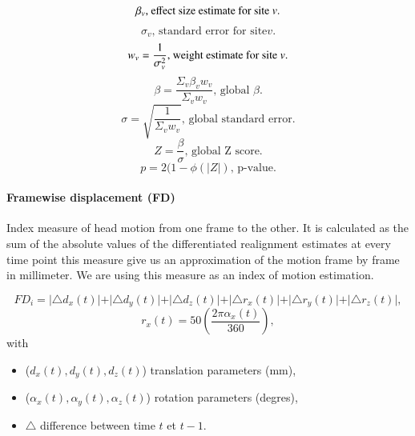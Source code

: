 \documentclass[authoryear]{elsarticle}
\begin{document}
\begin{equation}
	\beta_{v} \text{, effect size estimate for site \textit{v}.}
\end{equation}
\begin{equation}
	\sigma_{v} \text{, standard error for site} \textit{v}.
\end{equation}
\begin{equation}
 	w_{v}=\frac{1}{\sigma_{v}^{2}} \text{, weight estimate for site \textit{v}.}
 \end{equation}
 \begin{equation}
 	\beta=\frac{\Sigma_{v}\beta_{v}w_{v}}{\Sigma_{v}w_{v}} \text{, global }\beta.
 \end{equation}
  \begin{equation}
 	\sigma=\sqrt{\frac{1}{\Sigma_{v}w_{v}}} \text{, global standard error.}
 \end{equation}
\begin{equation}\label{METAL}
	Z=\frac{\beta}{\sigma} \text{, global Z score.}
\end{equation}
\begin{equation}
	p=2(1-\phi(\vert Z \vert) \text{, p-value.}
\end{equation}



\paragraph{Framewise displacement (FD)}
Index measure of head motion from one frame to the other. It is calculated as the sum of the absolute values of the differentiated realignment estimates at every time point \citep{Power2012} this measure give us an approximation of the motion frame by frame in millimeter. We are using this measure as an index of motion estimation.

\begin{equation}
    FD_{i} = \vert \triangle d_{x}(t) \vert + \vert \triangle d_{y}(t) \vert + \vert \triangle d_{z}(t) \vert + \vert \triangle r_x(t) \vert + \vert \triangle r_y(t) \vert + \vert \triangle r_z(t) \vert,
\end{equation}
\begin{equation}
  r_x(t) = 50\left(\frac{2\pi\alpha_x(t)}{360}\right),
\end{equation}
with 
\begin{itemize}
 \item ($d_x(t),d_{y}(t),d_{z}(t)$) translation parameters (mm),
 \item ($\alpha_x(t),\alpha_y(t),\alpha_z(t)$) rotation parameters (degres),
 \item $\triangle$ difference between time $t$ et $t-1$.
\end{itemize}
\end{document}
